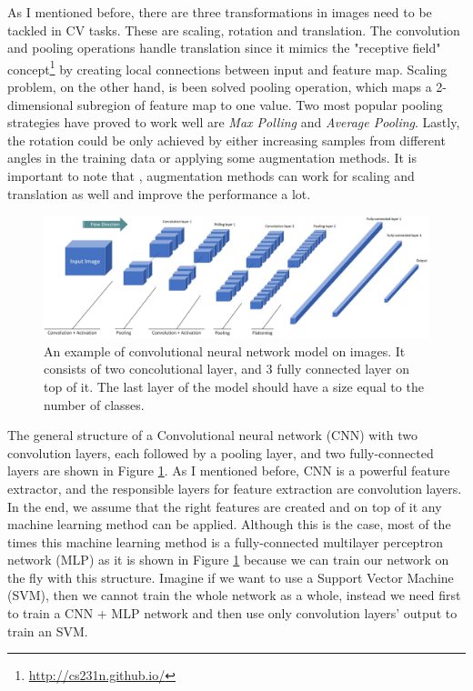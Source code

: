As I mentioned before, there are three transformations in images need to be tackled in CV tasks.  These are scaling, rotation and translation.  The convolution and pooling operations handle translation since it mimics the "receptive field" concept\footnote{\url{http://cs231n.github.io/}} by creating local connections between input and feature map.  Scaling problem,  on the other hand, is been solved pooling operation,  which maps a 2-dimensional subregion of feature map to one value.  Two most popular pooling strategies have proved to work well are \textit{Max Polling} and \textit{Average Pooling}.  Lastly, the rotation could be only achieved by either increasing samples from different angles in the training data or applying some augmentation methods.  It is important to note that  , augmentation methods  can work for scaling and translation as well and improve the performance a lot.\\

\begin{figure}[t!]
	\centering
  \includegraphics[width=\linewidth]{figures/cnn_whole} 
  \caption{An example of convolutional neural network model on images. It consists of two concolutional layer, and 3 fully connected layer on top of it. The last layer of the model should have a size equal to the number of classes.}
  \label{fig:cnn_whole}
\end{figure}

The general structure of a Convolutional neural network (CNN) with two convolution layers, each followed by a pooling layer, and two fully-connected layers are shown in Figure \ref{fig:cnn_whole}.  As I mentioned before, CNN is a powerful feature  extractor, and the responsible layers for feature extraction are convolution layers. In the end, we assume that the right features are created and on top of it any machine learning method can be applied. Although this is the case, most of the times this machine learning method is a fully-connected multilayer perceptron network (MLP)  as it is shown in Figure \ref{fig:cnn_whole} because we can train our network  on the fly with this structure.  Imagine if we want to use a Support  Vector  Machine (SVM), then we cannot train the whole network as a whole, instead we need first to train a CNN + MLP network and then use only convolution layers’ output to train an SVM.\\


